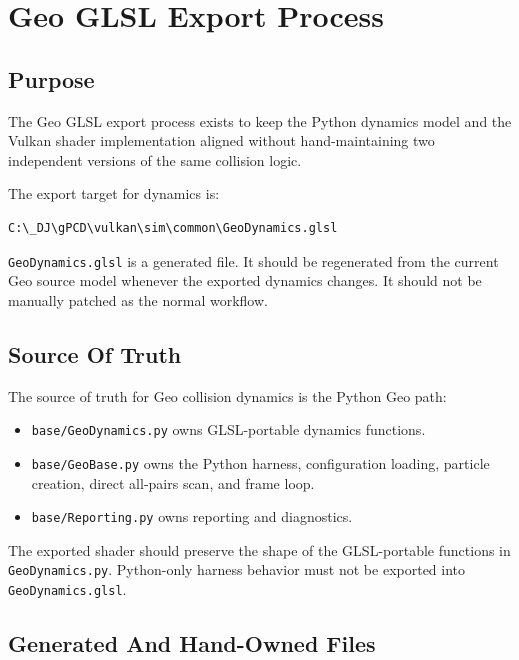\section{Geo GLSL Export Process}

\subsection{Purpose}

The Geo GLSL export process exists to keep the Python dynamics model and the
Vulkan shader implementation aligned without hand-maintaining two independent
versions of the same collision logic.

The export target for dynamics is:

\begin{verbatim}
C:\_DJ\gPCD\vulkan\sim\common\GeoDynamics.glsl
\end{verbatim}

\texttt{GeoDynamics.glsl} is a generated file.  It should be regenerated from
the current Geo source model whenever the exported dynamics changes.  It should
not be manually patched as the normal workflow.

\subsection{Source Of Truth}

The source of truth for Geo collision dynamics is the Python Geo path:

\begin{itemize}
    \item \texttt{base/GeoDynamics.py} owns GLSL-portable dynamics functions.
    \item \texttt{base/GeoBase.py} owns the Python harness, configuration
    loading, particle creation, direct all-pairs scan, and frame loop.
    \item \texttt{base/Reporting.py} owns reporting and diagnostics.
\end{itemize}

The exported shader should preserve the shape of the GLSL-portable functions in
\texttt{GeoDynamics.py}.  Python-only harness behavior must not be exported into
\texttt{GeoDynamics.glsl}.

\subsection{Generated And Hand-Owned Files}

